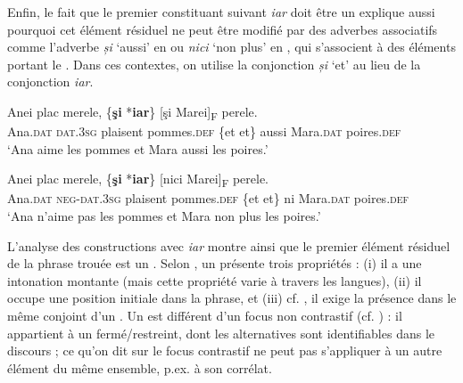 Enfin, le fait que le premier constituant suivant \textit{iar} doit être un  explique aussi pourquoi cet élément résiduel ne peut être modifié par des adverbes associatifs comme l’adverbe \textit{și} ‘aussi’ en  ou \textit{nici} ‘non plus’ en , qui s’associent à des éléments portant le . Dans ces contextes, on utilise la conjonction \textit{și} ‘et’ au lieu de la conjonction \textit{iar}. 


\ea
\ea 
\gll Anei    plac  merele,  \{\textbf{şi} {\textbar} *\textbf{iar}\}  [şi Marei]\textsubscript{F}  perele. \label{ch2:ex184a}\\
Ana.\textsc{dat} \textsc{dat.3sg}  plaisent  pommes.\textsc{def}  \{et {\textbar} et\}  aussi  Mara.\textsc{dat}  poires.\textsc{def}\\
\glt ‘Ana aime les pommes et Mara aussi les poires.’

\ex 
\gll Anei    plac  merele,  \{\textbf{şi} {\textbar} *\textbf{iar}\}  [nici  Marei]\textsubscript{F}  perele. \label{ch2:ex184b}\\
Ana.\textsc{dat} \textsc{neg-dat.3sg}  plaisent  pommes.\textsc{def} \{et {\textbar} et\}  ni  Mara.\textsc{dat} poires.\textsc{def}\\
\glt ‘Ana n’aime pas les pommes et Mara non plus les poires.’ 
\z
\z

L’analyse des constructions avec \textit{iar} montre ainsi que le premier élément résiduel de la phrase trouée est un . Selon \citet{Winkler2005}, un  présente trois propriétés : (i) il a une intonation montante (mais cette propriété varie à travers les langues), (ii) il occupe une position initiale dans la phrase, et (iii) cf. \citet{Molnar1998}, il exige la présence dans le même conjoint d’un . Un  est différent d’un focus non contrastif (cf. \citealt{Repp2010}) : il appartient à un  fermé/restreint, dont les alternatives sont identifiables dans le discours ; ce qu’on dit sur le focus con\-trastif ne peut pas s’appliquer à un autre élément du même ensemble, p.ex. à son corrélat.

